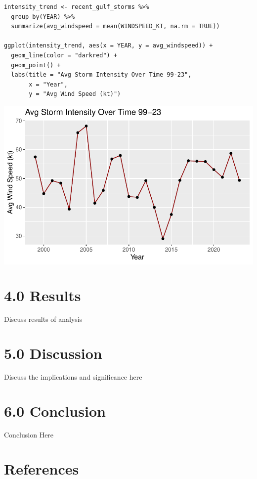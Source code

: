 \documentclass[12pt,letterpaper]{article}
\begin{document}
\begin{verbatim}
intensity_trend <- recent_gulf_storms %>%
  group_by(YEAR) %>%
  summarize(avg_windspeed = mean(WINDSPEED_KT, na.rm = TRUE))

ggplot(intensity_trend, aes(x = YEAR, y = avg_windspeed)) +
  geom_line(color = "darkred") +
  geom_point() +
  labs(title = "Avg Storm Intensity Over Time 99-23",
       x = "Year",
       y = "Avg Wind Speed (kt)")
\end{verbatim}

\includegraphics{GroupTask3_files/figure-pdf/Plots-4.pdf}

\newpage

\section{4.0 Results}\label{results}

Discuss results of analysis

\newpage

\section{5.0 Discussion}\label{discussion}

Discuss the implications and significance here

\newpage

\section{6.0 Conclusion}\label{conclusion}

Conclusion Here

\section*{References}\label{references}

\printbibliography[heading=none]
\end{document}
